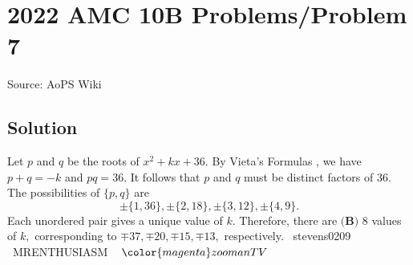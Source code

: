 \documentclass[12pt]{article}
\begin{document}
\section*{{2022 AMC 10B Problems/Problem 7}}
Source: AoPS Wiki

\subsection*{Solution}
Let $p$ and $q$ be the roots of $x^{2}+kx+36.$ By Vieta's Formulas , we have $p+q=-k$ and $pq=36.$ It follows that $p$ and $q$ must be distinct factors of $36.$ The possibilities of $\{p,q\}$ are \[\pm\{1,36\},\pm\{2,18\},\pm\{3,12\},\pm\{4,9\}.\] Each unordered pair gives a unique value of $k.$ Therefore, there are $\boxed{\textbf{(B) }8}$ values of $k,$ corresponding to $\mp37,\mp20,\mp15,\mp13,$ respectively. ~stevens0209 ~MRENTHUSIASM ~ $\color{magenta}zoomanTV$
\end{document}
